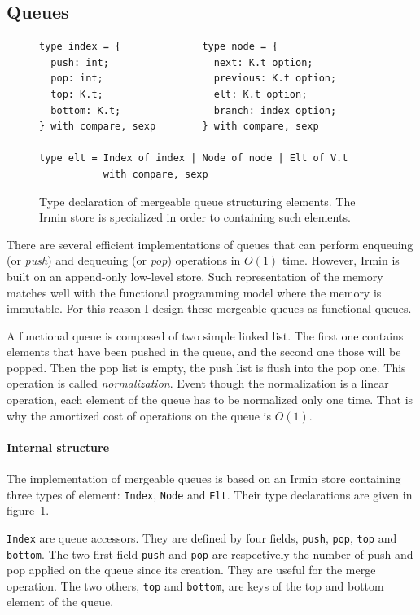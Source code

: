 \documentclass{article}
\renewcommand{\-}{\hyp}
\newcommand{\irmin}{Irmin\xspace}
\newcommand{\code}[1]{\texttt{#1}}
\begin{document}
\subsection{Queues}

\begin{figure}
\begin{lstlisting}
type index = {              type node = {
  push: int;                  next: K.t option;
  pop: int;                   previous: K.t option;
  top: K.t;                   elt: K.t option;
  bottom: K.t;                branch: index option;
} with compare, sexp        } with compare, sexp

type elt = Index of index | Node of node | Elt of V.t
           with compare, sexp
\end{lstlisting}
\caption{Type declaration of mergeable queue structuring elements. The \irmin store is specialized in order to containing such elements.}
\label{queue}
\end{figure}

There are several efficient implementations of queues that can perform enqueuing (or \emph{push}) and dequeuing (or \emph{pop}) operations in $O(1)$ time.
However, \irmin is built on an append-only low-level store.
Such representation of the memory matches well with the functional programming model where the memory is immutable.
For this reason I design these mergeable queues as functional queues.

A functional queue is composed of two simple linked list.
The first one contains elements that have been pushed in the queue, and the second one those will be popped.
Then the pop list is empty, the push list is flush into the pop one.
This operation is called \emph{normalization}.
Event though the normalization is a linear operation,  each element of the queue has to be normalized only one time.
That is why the amortized cost of operations on the queue is $O(1)$.


\paragraph{Internal structure}
The implementation of mergeable queues is based on an \irmin store containing three types of element: \code{Index}, \code{Node} and \code{Elt}. Their type declarations are given in figure~\ref{queue}.

\code{Index} are queue accessors.
They are defined by four fields, \code{push}, \code{pop}, \code{top} and \code{bottom}.
The two first field \code{push} and \code{pop} are respectively the number of push and pop applied on the queue since its creation.
They are useful for the merge operation.
The two others, \code{top} and \code{bottom}, are keys of the top and bottom element of the queue.
\end{document}
